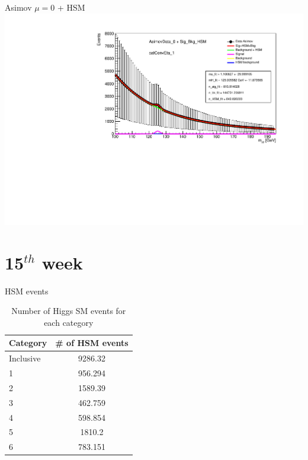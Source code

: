 \documentclass[10pt,UKenglish, leqno, xcolor = dvipsnames]{beamer}
\begin{document}
		\begin{frame}{Asimov $\mu=0$ + HSM}
			\vfill
			\centering
			\includegraphics[width=\textwidth]{../images/week_14/HSM_AsimovData_0_catConvEta_1.pdf}
			\vfill
		\end{frame}
	
	\section{15$^{th}$ week}
	\SectionPage
	
		\begin{frame}{HSM events}
			\vfill
			\centering
			\begin{table}[tbp]
				\centering
				\begin{tabular}{lc}
					\toprule[1.5pt]
					Category	& \# of HSM events	\\
					\midrule
					Inclusive	& 9286.32			\\
					1 			& 956.294 			\\
					2 			& 1589.39 			\\
					3 			& 462.759			\\
					4		 	& 598.854			\\
					5 			& 1810.2			\\
					6 			& 783.151			\\
					\bottomrule[1.5pt]
				\end{tabular}
				\caption{Number of Higgs SM events for each category}
			\end{table}
			\vfill
		\end{frame}	
	
\end{document}
